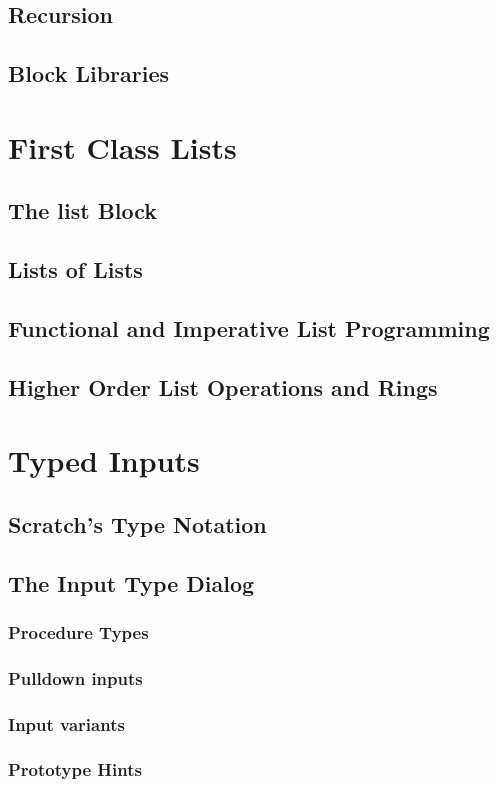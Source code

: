 \documentclass{report}
\begin{document}
\section{Recursion}
\section{Block Libraries}
\chapter{First Class Lists}
\section{The list Block}
\section{Lists of Lists}
\section{Functional and Imperative List Programming}
\section{Higher Order List Operations and Rings}
\chapter{Typed Inputs}
\section{Scratch's Type Notation}
\section{The \Snap{} Input Type Dialog}
\subsection{Procedure Types}
\subsection{Pulldown inputs}
\subsection{Input variants}
\subsection{Prototype Hints}
\end{document}
